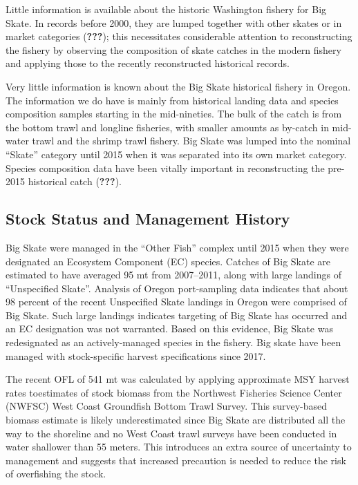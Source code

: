 \documentclass[12pt,]{article}
\begin{document}
Little information is available about the historic Washington fishery
for Big Skate. In records before 2000, they are lumped together with
other skates or in market categories ({\textbf{???}}); this necessitates
considerable attention to reconstructing the fishery by observing the
composition of skate catches in the modern fishery and applying those to
the recently reconstructed historical records.

Very little information is known about the Big Skate historical fishery
in Oregon. The information we do have is mainly from historical landing
data and species composition samples starting in the mid-nineties. The
bulk of the catch is from the bottom trawl and longline fisheries, with
smaller amounts as by-catch in mid-water trawl and the shrimp trawl
fishery. Big Skate was lumped into the nominal ``Skate'' category until
2015 when it was separated into its own market category. Species
composition data have been vitally important in reconstructing the
pre-2015 historical catch ({\textbf{???}}).

\hypertarget{stock-status-and-management-history}{%
\subsection{Stock Status and Management
History}\label{stock-status-and-management-history}}

Big Skate were managed in the ``Other Fish'' complex until 2015 when
they were designated an Ecosystem Component (EC) species. Catches of Big
Skate are estimated to have averaged 95 mt from 2007--2011, along with
large landings of ``Unspecified Skate''. Analysis of Oregon
port-sampling data indicates that about 98 percent of the recent
Unspecified Skate landings in Oregon were comprised of Big Skate. Such
large landings indicates targeting of Big Skate has occurred and an EC
designation was not warranted. Based on this evidence, Big Skate was
redesignated as an actively-managed species in the fishery. Big skate
have been managed with stock-specific harvest specifications since 2017.

The recent OFL of 541 mt was calculated by applying approximate MSY
harvest rates toestimates of stock biomass from the Northwest Fisheries
Science Center (NWFSC) West Coast Groundfish Bottom Trawl Survey. This
survey-based biomass estimate is likely underestimated since Big Skate
are distributed all the way to the shoreline and no West Coast trawl
surveys have been conducted in water shallower than 55 meters. This
introduces an extra source of uncertainty to management and suggests
that increased precaution is needed to reduce the risk of overfishing
the stock.
\end{document}

